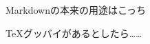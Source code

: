 \documentclass[14pt,dvipdfmx,uplatex]{beamer}
\begin{document}
{%
\begin{frame}[t]{\inhibitglue Markdownの本来の用途はこっち}
  \sffamily
  \begin{center}
  \end{center}
\end{frame}
}

{%
\begin{frame}[t]{\inhibitglue TeXグッバイがあるとしたら……}
  \sffamily
  \begin{center}
  \end{center}
\end{frame}
}
\end{document}
